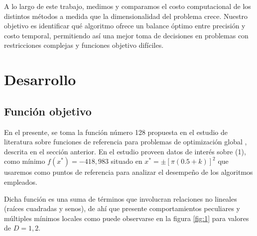 \documentclass[10pt,a4paper,twocolumn]{article}
\begin{document}
	A lo largo de este trabajo, medimos y comparamos el costo computacional de los distintos métodos a medida que la dimensionalidad del problema crece. Nuestro objetivo es identificar qué algoritmo ofrece un balance óptimo entre precisión y costo temporal, permitiendo así una mejor toma de decisiones en problemas con restricciones complejas y funciones objetivo difíciles.
	
	\section{Desarrollo}
		
		
		
		
	
		\subsection{Función objetivo}
		
			En el presente, se toma la función número 128 propuesta en el estudio de literatura sobre funciones de referencia para problemas de optimización global \cite{jamil2013literature}, descrita en el sección anterior. En el estudio proveen datos de interés sobre (1), como mínimo $f(x^*) = -418,983$ situado en $x^* = \pm [ \pi (0.5 + k)]^2$ que usaremos como puntos de referencia para analizar el desempeño de los algoritmos empleados.
			
			Dicha función es una suma de términos que involucran relaciones no lineales (raíces cuadradas y senos), de ahí que presente comportamientos peculiares y múltiples mínimos locales como puede observarse en la figura \ref{fig:1} para valores de $D=1,2$. 
		
\end{document}

